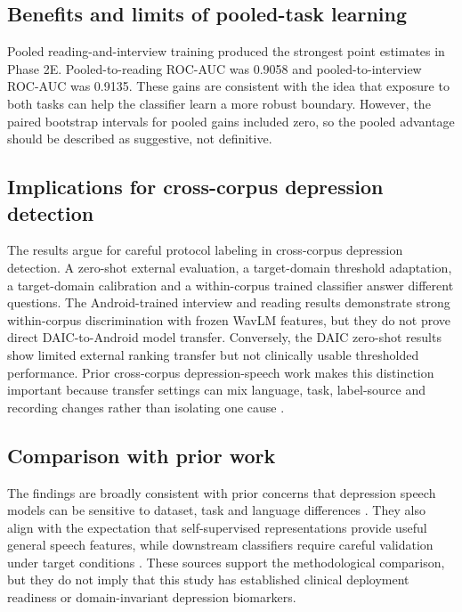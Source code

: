 \documentclass[lettersize,journal]{IEEEtran}
\begin{document}
\subsection{Benefits and limits of pooled-task learning}

Pooled reading-and-interview training produced the strongest point estimates in Phase 2E. Pooled-to-reading ROC-AUC was 0.9058 and pooled-to-interview ROC-AUC was 0.9135. These gains are consistent with the idea that exposure to both tasks can help the classifier learn a more robust boundary. However, the paired bootstrap intervals for pooled gains included zero, so the pooled advantage should be described as suggestive, not definitive.

\subsection{Implications for cross-corpus depression detection}

The results argue for careful protocol labeling in cross-corpus depression detection. A zero-shot external evaluation, a target-domain threshold adaptation, a target-domain calibration and a within-corpus trained classifier answer different questions. The Android-trained interview and reading results demonstrate strong within-corpus discrimination with frozen WavLM features, but they do not prove direct DAIC-to-Android model transfer. Conversely, the DAIC zero-shot results show limited external ranking transfer but not clinically usable thresholded performance. Prior cross-corpus depression-speech work makes this distinction important because transfer settings can mix language, task, label-source and recording changes rather than isolating one cause \cite{alghowinem2016crossCultural,seneviratne2021generalized,leal2025survey}.

\subsection{Comparison with prior work}

The findings are broadly consistent with prior concerns that depression speech models can be sensitive to dataset, task and language differences \cite{alghowinem2016crossCultural,seneviratne2021generalized,leal2025survey}. They also align with the expectation that self-supervised representations provide useful general speech features, while downstream classifiers require careful validation under target conditions \cite{baevski2020wav2vec2,yang2021superb,wu2023sslDepression,huang2024voicePretraining}. These sources support the methodological comparison, but they do not imply that this study has established clinical deployment readiness or domain-invariant depression biomarkers.
\end{document}
